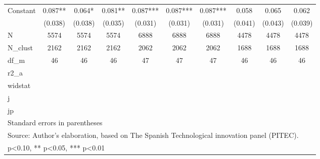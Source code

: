 \begin{table}[htbp]
\begin{tabular}{l*{9}{c}}
Constant            &       0.087** &       0.064*  &       0.081** &       0.087***&       0.087***&       0.087***&       0.058   &       0.065   &       0.062   \\
                    &     (0.038)   &     (0.038)   &     (0.035)   &     (0.031)   &     (0.031)   &     (0.031)   &     (0.041)   &     (0.043)   &     (0.039)   \\
\hline
N                   &        5574   &        5574   &        5574   &        6888   &        6888   &        6888   &        4478   &        4478   &        4478   \\
N\_clust             &        2162   &        2162   &        2162   &        2062   &        2062   &        2062   &        1688   &        1688   &        1688   \\
df\_m                &          46   &          46   &          46   &          47   &          47   &          47   &          46   &          46   &          46   \\
r2\_a                &               &               &               &               &               &               &               &               &               \\
widstat             &               &               &               &               &               &               &               &               &               \\
j                   &               &               &               &               &               &               &               &               &               \\
jp                  &               &               &               &               &               &               &               &               &               \\
\hline\hline
\multicolumn{10}{l}{\footnotesize Standard errors in parentheses}\\
\multicolumn{10}{l}{\footnotesize Source: Author's elaboration, based on The Spanish Technological innovation panel (PITEC).}\\
\multicolumn{10}{l}{\footnotesize * p<0.10, ** p<0.05, *** p<0.01}\\
\end{tabular}
\end{table}
